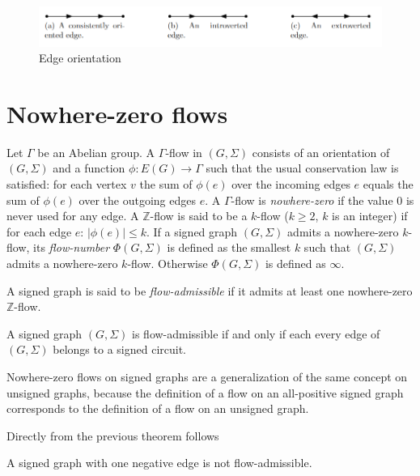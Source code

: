 \begin{figure}[ht]\label{fig:edge-orientation}
    \centering
    \includegraphics[scale=0.65]{images/oriented-edges.png}
    \caption{Edge orientation}
\end{figure}

\section{Nowhere-zero flows}

Let $\Gamma$ be an Abelian group. A $\Gamma$-flow in $(G, \Sigma)$ consists of an orientation of $(G, \Sigma)$ and
a function $\phi : E(G) \rightarrow \Gamma$ such that the usual conservation law is satisfied:
for each vertex $v$ the sum of $\phi (e)$ over the incoming edges $e$ equals the sum of $\phi (e)$ over the outgoing edges $e$\cite{nowhere-zero-flows-survey}.
A $\Gamma$-flow is \textit{nowhere-zero} if the value $0$ is never used for any edge.
A $\mathbb{Z}$-flow is said to be a $k$-flow ($k \geq 2$, $k$ is an integer) if for each edge $e$: $|\phi (e)| \leq k$.
If a signed graph $(G, \Sigma)$ admits a nowhere-zero $k$-flow, its \textit{flow-number} $\Phi (G, \Sigma)$ is defined as the smallest $k$ such that $(G, \Sigma)$ admits a nowhere-zero $k$-flow.
Otherwise $\Phi (G, \Sigma)$ is defined as $\infty$.

A signed graph is said to be \textit{flow-admissible} if it admits at least one nowhere-zero $\mathbb{Z}$-flow.

\begin{theorem}
    A signed graph $(G, \Sigma)$ is flow-admissible if and only if each every edge of $(G, \Sigma)$ belongs to a signed circuit.
\end{theorem}

Nowhere-zero flows on signed graphs are a generalization of the same concept on unsigned graphs,
because the definition of a flow on an all-positive signed graph corresponds to the definition of a flow on an unsigned graph.

Directly from the previous theorem follows

\begin{corollary}\label{one-negative-edge-flow}
    A signed graph with one negative edge is not flow-admissible.
\end{corollary}

